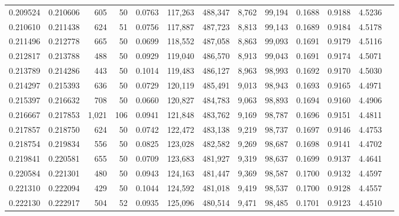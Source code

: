 \begin{tabular}{rrrrrrrrrrrrr}
0.209524 & 0.210606 &    605 &    50 &                                     0.0763 & 117,263 & 488,347 &   8,762 &  99,194 & 0.1688 & 0.9188 & 4.5236 \\
0.210610 & 0.211438 &    624 &    51 &                                     0.0756 & 117,887 & 487,723 &   8,813 &  99,143 & 0.1689 & 0.9184 & 4.5178 \\
0.211496 & 0.212778 &    665 &    50 &                                     0.0699 & 118,552 & 487,058 &   8,863 &  99,093 & 0.1691 & 0.9179 & 4.5116 \\
0.212817 & 0.213788 &    488 &    50 &                                     0.0929 & 119,040 & 486,570 &   8,913 &  99,043 & 0.1691 & 0.9174 & 4.5071 \\
0.213789 & 0.214286 &    443 &    50 &                                     0.1014 & 119,483 & 486,127 &   8,963 &  98,993 & 0.1692 & 0.9170 & 4.5030 \\
0.214297 & 0.215393 &    636 &    50 &                                     0.0729 & 120,119 & 485,491 &   9,013 &  98,943 & 0.1693 & 0.9165 & 4.4971 \\
0.215397 & 0.216632 &    708 &    50 &                                     0.0660 & 120,827 & 484,783 &   9,063 &  98,893 & 0.1694 & 0.9160 & 4.4906 \\
0.216667 & 0.217853 &  1,021 &   106 &                                     0.0941 & 121,848 & 483,762 &   9,169 &  98,787 & 0.1696 & 0.9151 & 4.4811 \\
0.217857 & 0.218750 &    624 &    50 &                                     0.0742 & 122,472 & 483,138 &   9,219 &  98,737 & 0.1697 & 0.9146 & 4.4753 \\
0.218754 & 0.219834 &    556 &    50 &                                     0.0825 & 123,028 & 482,582 &   9,269 &  98,687 & 0.1698 & 0.9141 & 4.4702 \\
0.219841 & 0.220581 &    655 &    50 &                                     0.0709 & 123,683 & 481,927 &   9,319 &  98,637 & 0.1699 & 0.9137 & 4.4641 \\
0.220584 & 0.221301 &    480 &    50 &                                     0.0943 & 124,163 & 481,447 &   9,369 &  98,587 & 0.1700 & 0.9132 & 4.4597 \\
0.221310 & 0.222094 &    429 &    50 &                                     0.1044 & 124,592 & 481,018 &   9,419 &  98,537 & 0.1700 & 0.9128 & 4.4557 \\
0.222130 & 0.222917 &    504 &    52 &                                     0.0935 & 125,096 & 480,514 &   9,471 &  98,485 & 0.1701 & 0.9123 & 4.4510 \\

\end{tabular}
